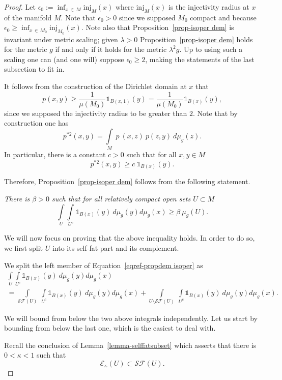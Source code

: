 \documentclass[AHL,Unicode,longabstracts,published]{cedram}
\newcommand{\rminj}{\mathrm{inj}}
\newcommand{\dsun}{\mathds{1}}
\newcommand{\cE}{\mathcal{E}}
\newcommand{\cSF}{\mathcal{SF}}
\newcommand{\inte}[1]{\underset{#1}{\int}}
\begin{document}
\begin{proof}
Let $\epsilon_0 := \inf_{x\,\in\,M} \rminj_M(x)$ where $\rminj_M(x)$ is the injectivity radius at $x$ of the manifold $M$. Note that $\epsilon_0 > 0$ since we supposed $M_0$ compact and because $ \epsilon_0 \ge \inf_{x\,\in\,M_0} \rminj_{M_0}(x)$. Note also that Proposition~\ref{prop-isoper dem} is invariant under metric scaling; given $\lambda > 0$ Proposition~\ref{prop-isoper dem} holds for the metric $g$ if and only if it holds for the metric $\lambda^2 g$. Up to using such a scaling one can (and one will) suppose $\epsilon_0 \ge 2$, making the statements of the last subsection to fit in. 

It follows from the construction of the Dirichlet domain at $x$ that
\[
p(x,y) \ge \frac{1}{\mu(M_0)} \dsun_{B(x,1)}(y) = \frac{1}{\mu(M_0)} \dsun_{B(x)}(y) ,
\]
since we supposed the injectivity radius to be greater than $2$. Note that by construction one has
\[
p^{*2}(x,y) = \inte{M} \ p~(x,z) \ p(z,y) \ d \mu_g(z) .
\]
In particular, there is a constant $c > 0$ such that for all $x,y \in M$
\[
p^{*2}(x,y) \ge c \ \dsun_{B(x)}(y) .
\]

Therefore, Proposition~\ref{prop-isoper dem} follows from the following statement. 
\vspace{3pt}


\emph{There is $\beta>0$ such that for all relatively compact open sets $U\subset M$}
\begin{equation}\label{eqref-propdem isoper}
\inte{U} \inte{U^c} \dsun_{B(x)}(y) \ d \mu_g(y) d \mu_g(x) \geq \beta\ \mu_g(U) .
\end{equation}

We will now focus on proving that the above inequality holds. In order to do so, we first split $U$ into its self-fat part and its complement. 

We split the left member of Equation~\eqref{eqref-propdem isoper} as 
\begin{multline}\label{eq1-propdem isoper}
\inte{U} \inte{U^c} \dsun_{B(x)}(y) \ d \mu_g(y) d \mu_g(x)  \\
= 
\inte{\cSF(U)} \ \inte{U^c} \dsun_{B(x)}(y) \ d \mu_g(y) d \mu_g(x) + \inte{U \setminus \cSF(U)} \ \inte{U^c} \dsun_{B(x)}(y) \ d \mu_g(y) d \mu_g(x) .
\end{multline}


We will bound from below the two above integrals independently. Let us start by bounding from below the last one, which is the easiest to deal with. 


Recall the conclusion of Lemma~\ref{lemma-selffatsubset} which asserts that there is $ 0<\kappa < 1$ such that
\[
\cE_{\kappa}(U) \subset \cSF(U) .
\]


\end{proof}
\end{document}
